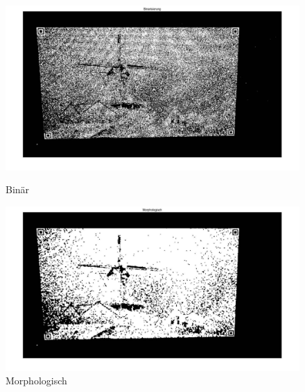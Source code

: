 \begin{figure}[H]
\centering 
\begin{minipage}[b]{0.49\textwidth} 
\centering 
\includegraphics[width=1.0\textwidth]{images/5_Implementirung/Binar.pdf} 
\caption{Binär}
\label{fig:binar}
\end{minipage}
\begin{minipage}[b]{0.49\textwidth} 
\centering 
\includegraphics[width=1.0\textwidth]{images/5_Implementirung/morpho.pdf}
\caption{Morphologisch}
\label{fig:morpho}
\end{minipage}
\end{figure}

